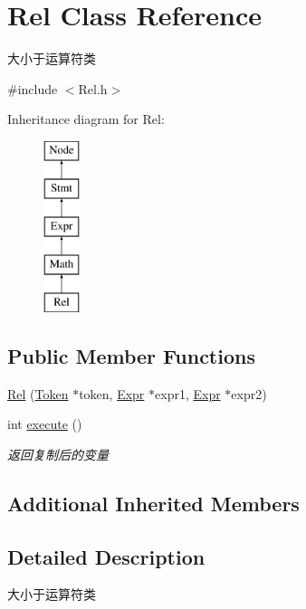 \hypertarget{class_rel}{}\section{Rel Class Reference}
\label{class_rel}


大小于运算符类  




{\ttfamily \#include $<$Rel.\+h$>$}

Inheritance diagram for Rel\+:\begin{figure}[H]
\begin{center}
\leavevmode
\includegraphics[height=5.000000cm]{class_rel}
\end{center}
\end{figure}
\subsection*{Public Member Functions}
\begin{DoxyCompactItemize}
\item 
\hyperlink{class_rel_a1f60bc90adde19ed35f26ea8b2cfd91c}{Rel} (\hyperlink{class_token}{Token} $\ast$token, \hyperlink{class_expr}{Expr} $\ast$expr1, \hyperlink{class_expr}{Expr} $\ast$expr2)
\item 
int \hyperlink{class_rel_a82b2f3b75a2b9e81631f2659d42a36d1}{execute} ()
\begin{DoxyCompactList}\small\item\em 返回复制后的变量 \end{DoxyCompactList}\end{DoxyCompactItemize}
\subsection*{Additional Inherited Members}


\subsection{Detailed Description}
大小于运算符类 

